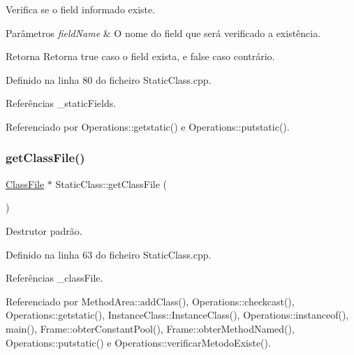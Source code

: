 Verifica se o field informado existe. 


\begin{DoxyParams}{Parâmetros}
{\em field\+Name} & O nome do field que será verificado a existência. \\
\hline
\end{DoxyParams}
\begin{DoxyReturn}{Retorna}
Retorna {\ttfamily true} caso o field exista, e {\ttfamily false} caso contrário. 
\end{DoxyReturn}


Definido na linha 80 do ficheiro Static\+Class.\+cpp.



Referências \+\_\+static\+Fields.



Referenciado por Operations\+::getstatic() e Operations\+::putstatic().

\mbox{\label{classStaticClass_ae00772669e7a0e54980ed303ff933cef}} 
\subsubsection{\texorpdfstring{get\+Class\+File()}{getClassFile()}}
{\footnotesize\ttfamily \hyperlink{classClassFile}{Class\+File} $\ast$ Static\+Class\+::get\+Class\+File (\begin{DoxyParamCaption}{ }\end{DoxyParamCaption})}



Destrutor padrão. 



Definido na linha 63 do ficheiro Static\+Class.\+cpp.



Referências \+\_\+class\+File.



Referenciado por Method\+Area\+::add\+Class(), Operations\+::checkcast(), Operations\+::getstatic(), Instance\+Class\+::\+Instance\+Class(), Operations\+::instanceof(), main(), Frame\+::obter\+Constant\+Pool(), Frame\+::obter\+Method\+Named(), Operations\+::putstatic() e Operations\+::verificar\+Metodo\+Existe().

\mbox{\label{classStaticClass_a24545b54a3e3b6ae17dc8cd04004c883}} 
